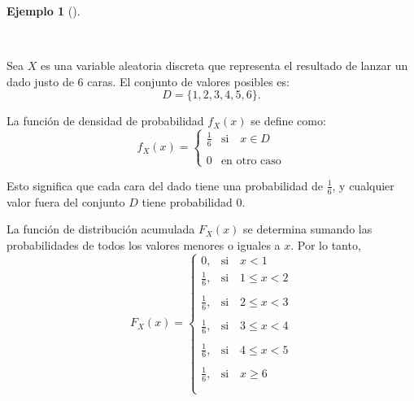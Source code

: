 \documentclass[
  us-letterpaper,
]{scrreprt}
\theoremstyle{plain}
\theoremstyle{definition}
\theoremstyle{definition}
\newtheorem{example}{Ejemplo}[chapter]
\theoremstyle{remark}
\begin{document}
\begin{example}[]\protect\hypertarget{exm-LDADO}{}\label{exm-LDADO}

~

\begin{tcolorbox}[enhanced jigsaw, colback=white, toptitle=1mm, arc=.35mm, rightrule=.15mm, left=2mm, colframe=quarto-callout-caution-color-frame, breakable, leftrule=.75mm, colbacktitle=quarto-callout-caution-color!10!white, coltitle=black, opacityback=0, bottomtitle=1mm, bottomrule=.15mm, titlerule=0mm, opacitybacktitle=0.6, toprule=.15mm, title={\textbf{Lanzamiento de un dado}}]

Sea \(X\) es una variable aleatoria discreta que representa el resultado
de lanzar un dado justo de 6 caras. El conjunto de valores posibles es:
\[ D =\{ 1,2,3,4,5,6 \}.\]

La función de densidad de probabilidad \(f_X (x)\) se define como:
\[ f_X (x) = 
    \left\{ \begin{array}{lcc} \frac{1}{6} & \text{si } \ \ \ x \in D \\ \\ 0 & \text{en otro caso}  \end{array} \right . \]

Esto significa que cada cara del dado tiene una probabilidad de
\(\frac{1}{6}\), y cualquier valor fuera del conjunto \(D\) tiene
probabilidad \(0\).

La función de distribución acumulada \(F_X (x)\) se determina sumando
las probabilidades de todos los valores menores o iguales a \(x\). Por
lo tanto, \[ F_X (x) = 
    \left\{ \begin{array}{lcc} 0, & \text{si } \ \ \ x < 1 \\ 
    \frac{1}{6}, & \text{si } \ \ \ 1  \leq x <2 \\ \\ 
    \frac{1}{6}, & \text{si } \ \ \ 2 \leq x < 3 \\ \\ 
     \frac{1}{6}, & \text{si } \ \ \ 3 \leq x <4 \\  \\ 
     \frac{1}{6}, & \text{si } \ \ \ 4 \leq x <5 \\  \\ 
     \frac{1}{6}, & \text{si } \ \ \  x \geq 6 \\ \\ 
     \end{array} \right . \]

\end{tcolorbox}

\end{example}
\end{document}
